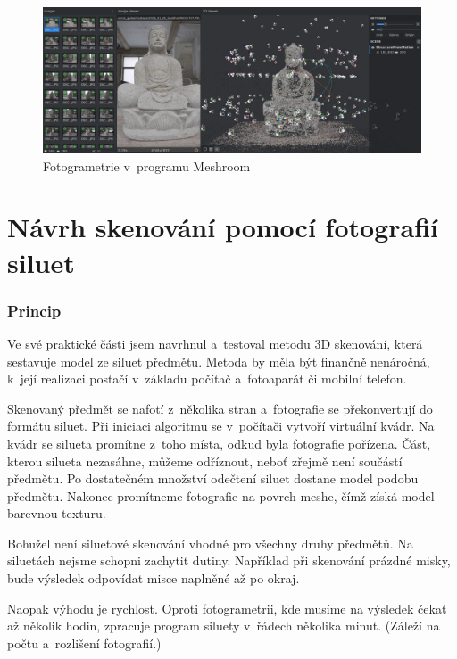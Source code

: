 \documentclass[12pt]{report}			%
\begin{document}
                \begin{figure}[h]
                    \centering
                    \includegraphics[width=15cm]{images/meshroom.png}
                    \caption{Fotogrametrie v~programu Meshroom \cite{meshroomSoftware}}
                \end{figure}

	\part{Návrh skenování pomocí fotografií siluet}


	        \section{Princip}

	            Ve své praktické části jsem navrhnul a~testoval metodu 3D skenování, která sestavuje model ze siluet předmětu. Metoda by měla být finančně nenáročná, k~její realizaci postačí v~základu počítač a~fotoaparát či mobilní telefon.

	            Skenovaný předmět se nafotí z~několika stran a~fotografie se překonvertují do formátu siluet. Při iniciaci algoritmu se v~počítači vytvoří virtuální kvádr. Na kvádr se silueta promítne z~toho místa, odkud byla fotografie pořízena. Část, kterou silueta nezasáhne, můžeme odříznout, neboť zřejmě není součástí předmětu. Po dostatečném množství odečtení siluet dostane model podobu předmětu. Nakonec promítneme fotografie na povrch meshe, čímž získá model barevnou texturu.

	            Bohužel není siluetové skenování vhodné pro všechny druhy předmětů. Na siluetách nejsme schopni zachytit dutiny. Například při skenování prázdné misky, bude výsledek odpovídat misce naplněné až po okraj.

	            Naopak výhodu je rychlost. Oproti fotogrametrii, kde musíme na výsledek čekat až několik hodin, zpracuje program siluety v~řádech několika minut. (Záleží na počtu a~rozlišení fotografií.)
\end{document}
